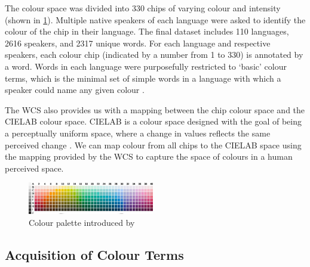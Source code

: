 \documentclass[11pt]{article}
\begin{document}
The colour space was divided into 330 chips of varying colour and intensity (shown in \ref{fig:colour_palette}). 
Multiple native speakers of each language were asked to identify the colour of the chip in their language.
The final dataset includes 110 languages, 2616 speakers, and 2317 unique words.  
For each language and respective speakers, each colour chip (indicated by a number from 1 to 330) is annotated by a word. 
Words in each language were purposefully restricted to `basic' colour terms, which is the minimal set of simple words in a language with which a speaker could name any given colour \cite{berlin1991basic}.

The WCS also provides us with a mapping between the chip colour space and the CIELAB colour space.
CIELAB is a colour space designed with the goal of being a perceptually uniform space, where a change in values reflects the same perceived change \cite{CIELAB}.
We can map colour from all chips to the CIELAB space using the mapping provided by the WCS to capture the space of colours in a human perceived space.

\begin{figure}[t]
    \centering
    \includegraphics[width=0.49\textwidth]{docs/intro_rate_distortion/graphs/colour_palette.jpg}
    \caption{Colour palette introduced by \citet{berlin1991basic}}
    \label{fig:colour_palette}
\end{figure}

\subsection{Acquisition of Colour Terms}
\label{ssec:back_colour_learning}
\end{document}
